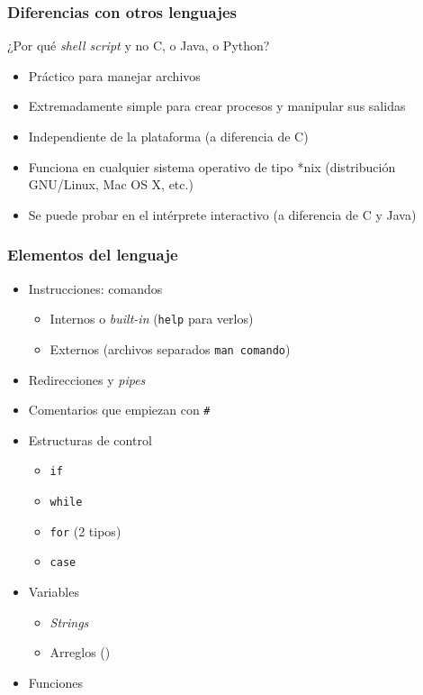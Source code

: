\begin{frame}
	\frametitle{Diferencias con otros lenguajes}
	¿Por qué \textit{shell script} y no C, o Java, o Python?
	\begin{itemize}
		\item Práctico para manejar archivos
		\item Extremadamente \alert{simple} para crear procesos y manipular
          sus salidas
		\item \alert{Independiente} de la plataforma (a diferencia de C)
		\item Funciona en cualquier sistema operativo de tipo *nix
          (distribución GNU/Linux, Mac OS X, etc.)
		\item Se puede probar en el \alert{intérprete interactivo} (a
          diferencia de C y Java)
	\end{itemize}
\end{frame}

\begin{frame}
	\frametitle{Elementos del lenguaje}
	\begin{itemize}
		\item Instrucciones: comandos
		\begin{itemize}
			\item Internos o \textit{built-in} (\texttt{help} para verlos)
			\item Externos (archivos separados \texttt{man comando})
		\end{itemize}
		\item Redirecciones y \textit{pipes}
		\item Comentarios que empiezan con \texttt{\#}
		\item Estructuras de control
		\begin{itemize}
			\item \texttt{if}
			\item \texttt{while}
			\item \texttt{for} (2 tipos)
			\item \texttt{case}
		\end{itemize}
		\item Variables
		\begin{itemize}
			\item \textit{Strings}
			\item Arreglos ()
		\end{itemize}
		\item Funciones
	\end{itemize}
\end{frame}

